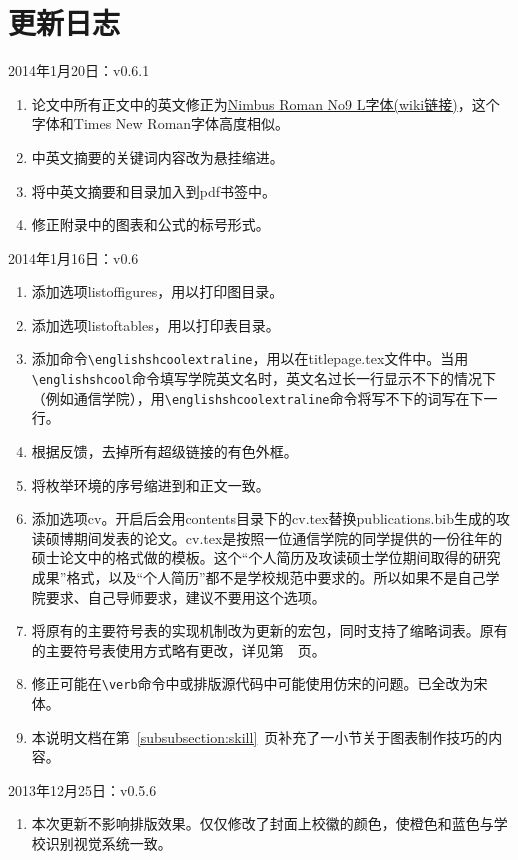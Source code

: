
\chapter{更新日志}
\noindent
2014年1月20日：v0.6.1
\begin{enumerate}
\item 论文中所有正文中的英文修正为\href{http://en.wikipedia.org/wiki/Nimbus_Roman_No9_L}{Nimbus Roman No9 L字体(wiki链接)}，这个字体和Times New Roman字体高度相似。
\item 中英文摘要的关键词内容改为悬挂缩进。
\item 将中英文摘要和目录加入到pdf书签中。
\item 修正附录中的图表和公式的标号形式。

\end{enumerate}

\noindent
2014年1月16日：v0.6
\begin{enumerate}
\item 添加选项listoffigures，用以打印图目录。
\item 添加选项listoftables，用以打印表目录。
\item 添加命令\verb|\englishshcoolextraline|，用以在titlepage.tex文件中。当用\\ \verb|\englishshcool|命令填写学院英文名时，英文名过长一行显示不下的情况下（例如通信学院），用\verb|\englishshcoolextraline|命令将写不下的词写在下一行。
\item 根据反馈，去掉所有超级链接的有色外框。
\item 将枚举环境的序号缩进到和正文一致。
\item 添加选项cv。开启后会用contents目录下的cv.tex替换publications.bib生成的攻读硕博期间发表的论文。cv.tex是按照一位通信学院的同学提供的一份往年的硕士论文中的格式做的模板。这个“个人简历及攻读硕士学位期间取得的研究成果”格式，以及“个人简历”都不是学校规范中要求的。所以如果不是自己学院要求、自己导师要求，建议不要用这个选项。
\item 将原有的主要符号表的实现机制改为更新的宏包，同时支持了缩略词表。原有的主要符号表使用方式略有更改，详见第~\pageref{subsection:glossaries}~页。
\item 修正可能在\verb|\verb|命令中或排版源代码中可能使用仿宋的问题。已全改为宋体。
\item 本说明文档在第~\ref{subsubsection:skill}~页补充了一小节关于图表制作技巧的内容。
\end{enumerate}

\noindent
2013年12月25日：v0.5.6
\begin{enumerate}
\item 本次更新不影响排版效果。仅仅修改了封面上校徽的颜色，使橙色和蓝色与学校识别视觉系统一致。
\end{enumerate}

